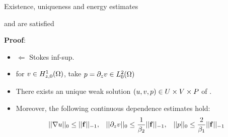 \begin{frame}{Existence, uniqueness and energy estimates}

  \begin{lemma}
    \ISp and \ISv are satisfied
  \end{lemma}
  \textbf{Proof}:
  \begin{itemize}
  \item \ISp $\Leftarrow$ Stokes inf-sup.
  \item \ISv for $v\in H_{z,0}^1(\Omega)$, take $p=\partial_z v\in L_0^2(\Omega)$
  \end{itemize}



\vfill

\begin{theorem}
  \begin{itemize}
  \item There exists an unique weak solution $(u,v,p)\in
    U\times V\times P$ of \hydStokes.
  \item
    Moreover, the following continuous dependence estimates hold:
    \begin{equation*}
      \label{eq:stability.estimates}
      \begin{aligned}
        ||\nabla u||_0 \le ||\mathbf{f}||_{-1}, && ||\partial_z v||_0 \le
        \frac{1}{\beta_2}||\mathbf{f}||_{-1}, && ||p||_0 \le \frac{2}
        {\beta_1}||\mathbf{f}||_{-1}
      \end{aligned}
    \end{equation*}
  \end{itemize}
  \label{theorem:1}
\end{theorem}
\end{frame}

